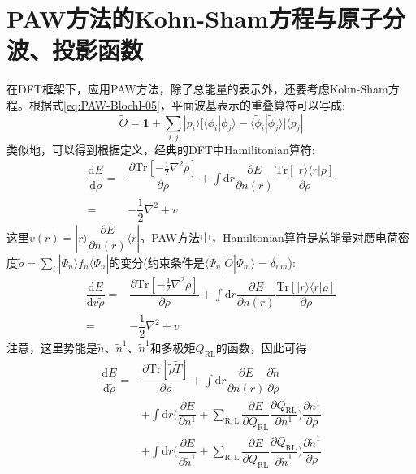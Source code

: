 \section{PAW方法的Kohn-Sham方程与原子分波、投影函数}
在\textrm{DFT}框架下，应用\textrm{PAW}方法，除了总能量的表示外，还要考虑\textrm{Kohn-Sham}方程。根据式\eqref{eq:PAW-Blochl-05}，平面波基表示的重叠算符可以写成:
\begin{equation}
	\tilde O=\mathbf{1}+\sum_{i,j}|\tilde p_i\rangle\bigg[\langle\phi_i|\phi_j\rangle-\langle\tilde\phi_i|\tilde\phi_j\rangle\bigg]\langle\tilde p_j|
	\label{eq:PAW-Blochl-14}
\end{equation}
类似地，可以得到根据定义，经典的\textrm{DFT}中\textrm{Hamilitonian}算符:%
\begin{equation}
	\begin{aligned}
		\dfrac{\mathrm{d}E}{\mathrm{d}\rho}=&\dfrac{\partial\mathrm{Tr}[-\frac12\nabla^2\rho]}{\partial\rho}+\int\mathrm{d}r\dfrac{\partial E}{\partial n(r)}\dfrac{\mathrm{Tr}[|r\rangle\langle r|\rho]}{\partial\rho}\\
		=&-\dfrac12\nabla^2+v
	\end{aligned}
	\label{eq:PAW-DFT-H}
\end{equation}
这里$v(r)=|r\rangle\dfrac{\partial E}{\partial n(r)}\langle r|$。\textrm{PAW}方法中，\textrm{Hamiltonian}算符是总能量对赝电荷密度$\tilde\rho=\sum\limits_i|\tilde\Psi_n\rangle f_n\langle\tilde\Psi_n|$的变分(约束条件是$\langle\tilde\Psi_n|\tilde O|\tilde\Psi_m\rangle=\delta_{nm}$):
\begin{equation}
	\begin{aligned}
		\dfrac{\mathrm{d}E}{\mathrm{d}v\tilde\rho}=&\dfrac{\partial\mathrm{Tr}[-\frac12\nabla^2\rho]}{\partial\rho}+\int\mathrm{d}r\dfrac{\partial E}{\partial n(r)}\dfrac{\mathrm{Tr}[|r\rangle\langle r|\rho]}{\partial\rho}\\
		=&-\dfrac12\nabla^2+v
	\end{aligned}
	\label{eq:PAW-Blochl-H}
\end{equation}
注意，这里势能是$\tilde n$、$\tilde n^1$、$\tilde n^1$和多极矩$Q_{\mathrm{RL}}$的函数，因此可得
\begin{equation}
	\begin{aligned}
		\dfrac{\mathrm{d}E}{\mathrm{d}\tilde\rho}=&\dfrac{\partial\mathrm{Tr}[\tilde\rho\tilde T]}{\partial\rho}+\int\mathrm{d}r\dfrac{\partial E}{\partial n(r)}\dfrac{\partial\tilde n}{\partial\rho}\\
		&+\int\mathrm{d}r\bigg(\dfrac{\partial E}{\partial n^1}+\sum_{\mathrm{R,L}}\dfrac{\partial E}{\partial Q_{\mathrm{RL}}}\dfrac{\partial Q_{\mathrm{RL}}}{\partial n^1}\bigg)\dfrac{\partial n^1}{\partial\rho}\\
		&+\int\mathrm{d}r\bigg(\dfrac{\partial E}{\partial\tilde n^1}+\sum_{\mathrm{R,L}}\dfrac{\partial E}{\partial Q_{\mathrm{RL}}}\dfrac{\partial Q_{\mathrm{RL}}}{\partial\tilde n^1}\bigg)\dfrac{\partial\tilde n^1}{\partial\rho} 
	\end{aligned}
	\label{eq:PAW-Blochl-H-n}
\end{equation}
